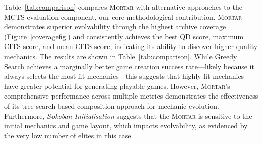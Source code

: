 \documentclass{article} %
\newcommand{\name}{\textsc{Mortar}}
\begin{document}
Table~\ref{tab:comparison} compares \name{} with alternative approaches to the MCTS evaluation component, our core methodological contribution. \name{} demonstrates superior evolvability through the highest archive coverage (Figure~\ref{coveragefig}) and consistently achieves the best QD score, maximum CITS score, and mean CITS score, indicating its ability to discover higher-quality mechanics. The results are shown in Table~\ref{tab:comparison}. While Greedy Search achieves a marginally better game creation success rate---likely because it always selects the most fit mechanics---this suggests that highly fit mechanics have greater potential for generating playable games. However, \name{}'s comprehensive performance across multiple metrics demonstrates the effectiveness of its tree search-based composition approach for mechanic evolution. Furthermore, \textit{Sokoban Initialisation} suggests that the \name{} is sensitive to the initial mechanics and game layout, which impacts evolvability, as evidenced by the very low number of elites in this case.

\begin{table}[h]
\centering
\caption{Comparison of \name{} with alternative mechanic selection strategies: LLM-based selection, random selection, and greedy fitness-based selection across quality-diversity metrics.}
\label{tab:comparison}
\end{table}
\end{document}

